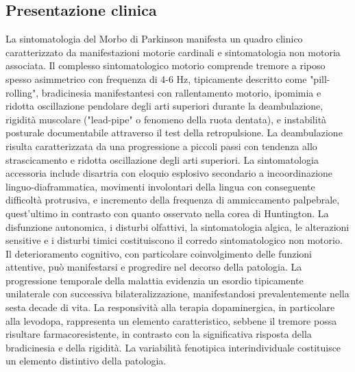 \subsection{Presentazione  clinica}
La sintomatologia del Morbo di Parkinson manifesta un quadro clinico caratterizzato da manifestazioni motorie cardinali e sintomatologia non motoria associata. Il complesso sintomatologico motorio comprende tremore a riposo spesso asimmetrico con frequenza di 4-6 Hz, tipicamente descritto come "pill-rolling", bradicinesia manifestantesi con rallentamento motorio, ipomimia e ridotta oscillazione pendolare degli arti superiori durante la deambulazione, rigidità muscolare ("lead-pipe" o fenomeno della ruota dentata), e instabilità posturale documentabile attraverso il test della retropulsione. La deambulazione risulta caratterizzata da una progressione a piccoli passi con tendenza allo strascicamento e ridotta oscillazione degli arti superiori.
La sintomatologia accessoria include disartria con eloquio esplosivo secondario a incoordinazione linguo-diaframmatica, movimenti involontari della lingua con conseguente difficoltà protrusiva, e incremento della frequenza di ammiccamento palpebrale, quest'ultimo in contrasto con quanto osservato nella corea di Huntington. La disfunzione autonomica, i disturbi olfattivi, la sintomatologia algica, le alterazioni sensitive e i disturbi timici costituiscono il corredo sintomatologico non motorio. Il deterioramento cognitivo, con particolare coinvolgimento delle funzioni attentive, può manifestarsi e progredire nel decorso della patologia.
La progressione temporale della malattia evidenzia un esordio tipicamente unilaterale con successiva bilateralizzazione, manifestandosi prevalentemente nella sesta decade di vita. La responsività alla terapia dopaminergica, in particolare alla levodopa, rappresenta un elemento caratteristico, sebbene il tremore possa risultare farmacoresistente, in contrasto con la significativa risposta della bradicinesia e della rigidità. La variabilità fenotipica interindividuale costituisce un elemento distintivo della patologia.

